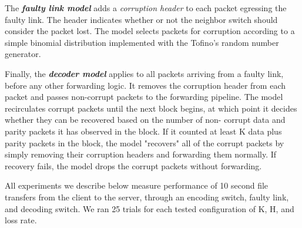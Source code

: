 The \textbf{\em faulty link model} adds a \emph{corruption header} to each packet
egressing the faulty link. The header indicates whether or not the neighbor
switch should consider the packet lost. The model selects packets for
corruption according to a simple binomial distribution implemented with the
Tofino's random number generator.

Finally, the \textbf{\em decoder model} applies to all packets arriving from a
faulty link, before any other forwarding logic. It removes the corruption
header from each packet and passes non-corrupt packets to the forwarding
pipeline. The model recirculates corrupt packets until the next block begins,
at which point it decides whether they can be recovered based on the number of
non- corrupt data and parity packets it has observed in the block. If it
counted at least K data plus parity packets  in the block, the model
"recovers" all of the corrupt packets by simply removing their corruption
headers and forwarding them normally. If recovery fails, the model drops the
corrupt packets without forwarding.

All experiments we describe below measure performance of 10 second file
transfers from the client to the server, through an encoding switch, faulty
link, and decoding switch. We ran 25 trials for each tested configuration of
K, H,  and loss rate.


